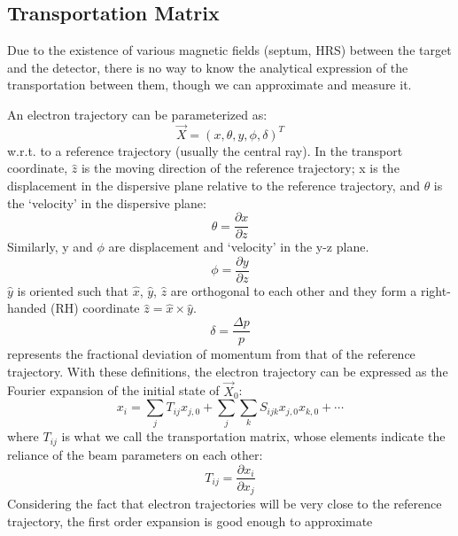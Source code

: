 \subsection{Transportation Matrix}
Due to the existence of various magnetic fields (septum, HRS) between the target 
and the detector, there is no way to know the analytical expression of the transportation
between them, though we can approximate and measure it.

An electron trajectory can be parameterized as: 
\begin{equation}
    \vec{X} = (x, \theta, y, \phi, \delta)^T
\end{equation}
w.r.t. to a reference trajectory (usually the central ray). In the transport coordinate, 
$\hat{z}$ is the moving direction of the reference trajectory;
x is the displacement in the dispersive plane relative to the reference 
trajectory, and $\theta$ is the `velocity' in the dispersive plane:
\begin{equation}
    \theta = \frac{\partial x}{\partial z}
\end{equation}
Similarly, y and $\phi$ are displacement and `velocity' in the y-z plane. 
\begin{equation}
    \phi = \frac{\partial y}{\partial z}
\end{equation}
$\hat{y}$ is oriented such that $\hat{x}$, $\hat{y}$, $\hat{z}$ are orthogonal 
to each other and they form a right-handed (RH) coordinate $\hat{z} = \hat{x} \times \hat{y}$.
\begin{equation}
    \delta = \frac{\Delta p}{p}
\end{equation}
represents the fractional deviation of momentum from that of the reference trajectory. 
With these definitions, the electron trajectory can be expressed
as the Fourier expansion of the initial state of $\vec{X}_0$:
\begin{equation}
    x_i = \sum_j T_{ij} x_{j,0} + \sum_j \sum_k S_{ijk} x_{j,0}x_{k, 0} + \cdots
    \label{eq:transportation}
\end{equation}
where $T_{ij}$ is what we call the transportation matrix, whose elements indicate
the reliance of the beam parameters on each other: 
\begin{equation}
    T_{ij} = \frac{\partial x_i}{\partial x_j}
\end{equation}
Considering the fact that electron trajectories will be very close to the 
reference trajectory, the first order expansion is good enough to approximate 
